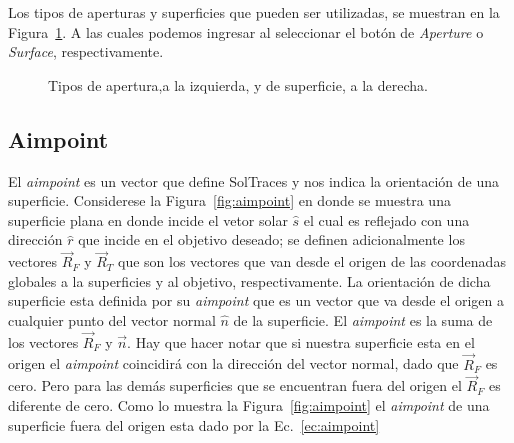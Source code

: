 \documentclass[12pt, spanish]{article}
\theoremstyle{problemstyle}
\begin{document}
Los tipos de aperturas y superficies que pueden ser utilizadas, se muestran en la Figura~\ref{fig:elementos}. A las cuales podemos ingresar al seleccionar el botón de \emph{Aperture} o \emph{Surface}, respectivamente.

\begin{figure}[ht]
  \centering
  \caption{\label{fig:elementos} Tipos de apertura,a la izquierda, y de superficie, a la derecha.}
\end{figure}

\subsection{Aimpoint}
\label{subsec:aimpoint}

El \emph{aimpoint} es un vector que define SolTraces y nos indica la orientación de una superficie. Considerese la Figura~\ref{fig:aimpoint} en donde se muestra una superficie plana en donde incide el vetor solar $\hat s$ el cual es reflejado con una dirección $\hat r$ que incide en el objetivo deseado; se definen adicionalmente los vectores $\vec R_F$ y $\vec R_T$ que son los vectores que van desde el origen de las coordenadas globales a la superficies y al objetivo, respectivamente. La orientación de dicha superficie esta definida por su \emph{aimpoint} que es un vector que va desde el origen a cualquier punto del vector normal $\hat n$ de la superficie. El \emph{aimpoint} es la suma de los vectores $\vec R_F$ y $\vec n$. Hay que hacer notar que si nuestra superficie esta en el origen el \emph{aimpoint} coincidirá con la  dirección del vector normal, dado que $\vec R_F$ es cero. Pero para las demás superficies que se encuentran fuera del origen el $\vec R_F$ es diferente de cero. Como lo muestra la Figura~\ref{fig:aimpoint} el \emph{aimpoint} de una superficie fuera del origen esta dado por la Ec.~\ref{ec:aimpoint}
\end{document}
